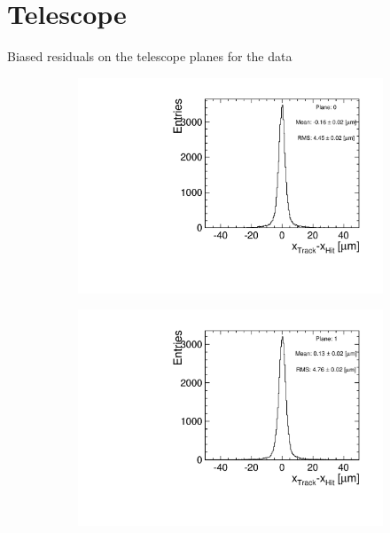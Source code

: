 \chapter{Telescope}
\label{sec:appendixTelescope}

Biased residuals on the telescope planes for the data

\begin{figure}[htbp] \centering
  \begin{subfigure}[b]{0.3\textwidth}
    \includegraphics[width=\textwidth]{figures/Telescope/biasedResiduals/BiasedResiduals_run661_PlaneXRMS0.pdf}
    \caption{}
  \end{subfigure}\hfill
  \begin{subfigure}[b]{0.3\textwidth}
    \includegraphics[width=\textwidth]{figures/Telescope/biasedResiduals/BiasedResiduals_run661_PlaneXRMS1.pdf}

\end{subfigure}
\end{figure}
